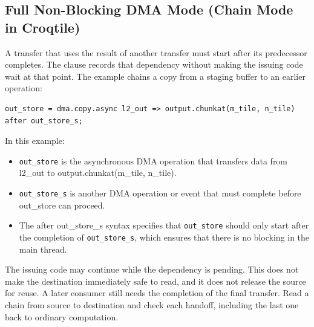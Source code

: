 \subsection*{Full Non-Blocking DMA Mode (Chain Mode in Croqtile)}

A transfer that uses the result of another transfer must start after its predecessor completes. The \co@after@ clause records that dependency without making the issuing code wait at that point. The example chains a copy from a staging buffer to an earlier operation:

\begin{lstlisting}[language=croqtile,caption={Full Non-Blocking DMA Mode (Chain Mode in Croqtile)}]
out_store = dma.copy.async l2_out => output.chunkat(m_tile, n_tile) after out_store_s;
\end{lstlisting}

In this example:

\begin{itemize}[leftmargin=1.6em]
\item \texttt{out\_store} is the asynchronous DMA operation that transfers data from l2\_out to output.chunkat(m\_tile, n\_tile).
\item \texttt{out\_store\_s} is another DMA operation or event that must complete before out\_store can proceed.
\item The after out\_store\_s syntax specifies that \texttt{out\_store} should only start after the completion of \texttt{out\_store\_s}, which ensures that there is no blocking in the main thread.
\end{itemize}

The issuing code may continue while the dependency is pending. This does not make the destination immediately safe to read, and it does not release the source for reuse. A later consumer still needs the completion of the final transfer. Read a chain from source to destination and check each handoff, including the last one back to ordinary computation.
